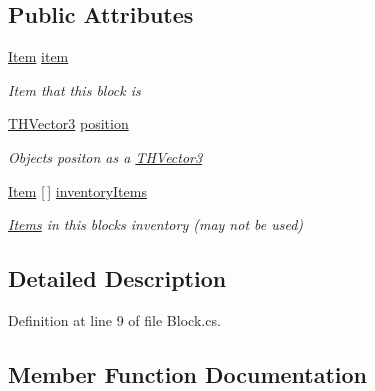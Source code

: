\subsection*{Public Attributes}
\begin{DoxyCompactItemize}
\item 
\hyperlink{struct_bee_game_1_1_items_1_1_item}{Item} \hyperlink{class_bee_game_1_1_blocks_1_1_block_addc8d61c8acab21b0f15df5fed804f11}{item}
\begin{DoxyCompactList}\small\item\em Item that this block is \end{DoxyCompactList}\item 
\hyperlink{struct_bee_game_1_1_t_h_vector3}{T\+H\+Vector3} \hyperlink{class_bee_game_1_1_blocks_1_1_block_a4bdeec76cfc1291eab6cebcd569620e6}{position}
\begin{DoxyCompactList}\small\item\em Objects positon as a \hyperlink{struct_bee_game_1_1_t_h_vector3}{T\+H\+Vector3} \end{DoxyCompactList}\item 
\hyperlink{struct_bee_game_1_1_items_1_1_item}{Item} \mbox{[}$\,$\mbox{]} \hyperlink{class_bee_game_1_1_blocks_1_1_block_a54846c7c7ec2f512484b3060de977fac}{inventory\+Items}
\begin{DoxyCompactList}\small\item\em \hyperlink{namespace_bee_game_1_1_items}{Items} in this blocks inventory (may not be used) \end{DoxyCompactList}\end{DoxyCompactItemize}


\subsection{Detailed Description}


Definition at line 9 of file Block.\+cs.



\subsection{Member Function Documentation}
\mbox{\label{class_bee_game_1_1_blocks_1_1_block_a03187300c8fd940defb0dbe2793d1d83}} 
